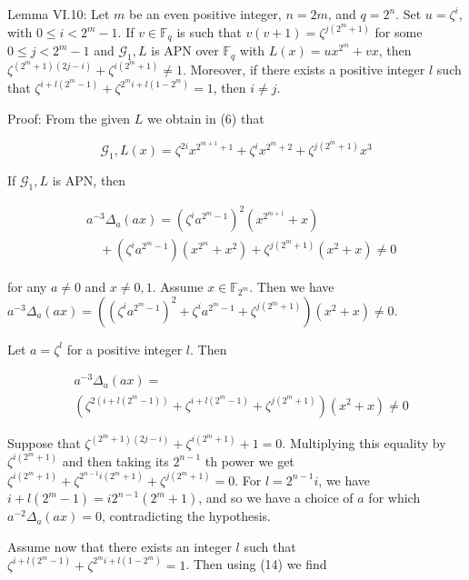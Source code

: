 \documentclass[10pt]{article}
\begin{document}
Lemma VI.10: Let $m$ be an even positive integer, $n=2 m$, and $q=2^{n}$. Set $u=\zeta^{i}$, with $0 \leq i<2^{m}-1$. If $v \in \mathbb{F}_{q}$ is such that $v(v+1)=\zeta^{j\left(2^{m}+1\right)}$ for some $0 \leq j<2^{m}-1$ and $\mathcal{G}_{1}, L$ is APN over $\mathbb{F}_{q}$ with $L(x)=u x^{2^{m}}+v x$, then $\zeta^{\left(2^{m}+1\right)(2 j-i)}+ \zeta^{i\left(2^{m}+1\right)} \neq 1$. Moreover, if there exists a positive integer $l$ such that $\zeta^{i+l\left(2^{m}-1\right)}+\zeta^{2^{m} i+l\left(1-2^{m}\right)}=1$, then $i \neq j$.

Proof: From the given $L$ we obtain in (6) that

$$
\mathcal{G}_{1}, L(x)=\zeta^{2 i} x^{2^{m+1}+1}+\zeta^{i} x^{2^{m}+2}+\zeta^{j\left(2^{m}+1\right)} x^{3}
$$

If $\mathcal{G}_{1}, L$ is APN, then

$$
\begin{aligned}
& a^{-3} \Delta_{a}(a x)=\left(\zeta^{i} a^{2^{m}-1}\right)^{2}\left(x^{2^{m+1}}+x\right) \\
& \quad+\left(\zeta^{i} a^{2^{m}-1}\right)\left(x^{2^{m}}+x^{2}\right)+\zeta^{j\left(2^{m}+1\right)}\left(x^{2}+x\right) \neq 0
\end{aligned}
$$

for any $a \neq 0$ and $x \neq 0,1$. Assume $x \in \mathbb{F}_{2^{m}}$. Then we have $a^{-3} \Delta_{a}(a x)=\left(\left(\zeta^{i} a^{2^{m}-1}\right)^{2}+\zeta^{i} a^{2^{m}-1}+\zeta^{j\left(2^{m}+1\right)}\right)\left(x^{2}+x\right) \neq 0$.

Let $a=\zeta^{l}$ for a positive integer $l$. Then


\begin{align*}
& a^{-3} \Delta_{a}(a x)= \\
& \left(\zeta^{2\left(i+l\left(2^{m}-1\right)\right)}+\zeta^{i+l\left(2^{m}-1\right)}+\zeta^{j\left(2^{m}+1\right)}\right)\left(x^{2}+x\right) \neq 0 \tag{14}
\end{align*}


Suppose that $\zeta^{\left(2^{m}+1\right)(2 j-i)}+\zeta^{i\left(2^{m}+1\right)}+1=0$. Multiplying this equality by $\zeta^{i\left(2^{m}+1\right)}$ and then taking its $2^{n-1}$ th power we get $\zeta^{i\left(2^{m}+1\right)}+\zeta^{2^{n-1} i\left(2^{m}+1\right)}+\zeta^{j\left(2^{m}+1\right)}=0$. For $l=2^{n-1} i$, we have $i+l\left(2^{m}-1\right)=i 2^{n-1}\left(2^{m}+1\right)$, and so we have a choice of $a$ for which $a^{-2} \Delta_{a}(a x)=0$, contradicting the hypothesis.

Assume now that there exists an integer $l$ such that $\zeta^{i+l\left(2^{m}-1\right)}+\zeta^{2^{m} i+l\left(1-2^{m}\right)}=1$. Then using (14) we find
\end{document}
